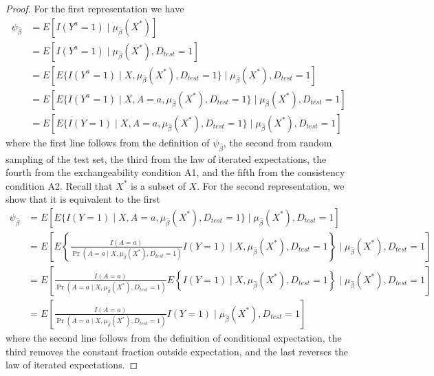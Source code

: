\begin{proof}
    For the first representation we have 
    \begin{align*}
        \psi_{\widehat{\beta}} &= E[I(Y^a = 1) \mid \mu_{\widehat{\beta}}(X^*)] \\
        & = E[I(Y^a = 1) \mid \mu_{\widehat{\beta}}(X^*), D_{test} = 1] \\
        & = E[E\{I(Y^a = 1) \mid X, \mu_{\widehat{\beta}}(X^*), D_{test} = 1\}\mid \mu_{\widehat{\beta}}(X^*), D_{test} = 1] \\
        & = E[E\{I(Y^a = 1) \mid X, A = a, \mu_{\widehat{\beta}}(X^*), D_{test} = 1\}\mid \mu_{\widehat{\beta}}(X^*), D_{test} = 1] \\
        & = E[E\{I(Y = 1) \mid X, A = a, \mu_{\widehat{\beta}}(X^*), D_{test} = 1\}\mid \mu_{\widehat{\beta}}(X^*), D_{test} = 1]
    \end{align*}
    where the first line follows from the definition of $\psi_{\widehat{\beta}}$, the second from random sampling of the test set, the third from the law of iterated expectations, the fourth from the exchangeability condition A1, and the fifth from the consistency condition A2. Recall that $X^*$ is a subset of $X$. For the second representation, we show that it is equivalent to the first 
    \begin{align*}
        \psi_{\widehat{\beta}} &= E[E\{I(Y = 1) \mid X, A = a, \mu_{\widehat{\beta}}(X^*), D_{test} = 1\}\mid \mu_{\widehat{\beta}}(X^*), D_{test} = 1] \\
        &= E\left[E\left\{\frac{I(A = a)}{\Pr(A = a \mid X, \mu_{\widehat{\beta}}(X^*), D_{test} = 1)} I(Y=1) \mid X, \mu_{\widehat{\beta}}(X^*), D_{test} = 1\right\}\mid \mu_{\widehat{\beta}}(X^*), D_{test} = 1\right] \\
        &= E\left[\frac{I(A = a)}{\Pr(A = a \mid X, \mu_{\widehat{\beta}}(X^*), D_{test} = 1)}E\left\{ I(Y=1) \mid X, \mu_{\widehat{\beta}}(X^*), D_{test} = 1\right\}\mid \mu_{\widehat{\beta}}(X^*), D_{test} = 1\right]\\
        &= E\left[\frac{I(A = a)}{\Pr(A = a \mid X, \mu_{\widehat{\beta}}(X^*), D_{test} = 1)} I(Y=1) \mid \mu_{\widehat{\beta}}(X^*), D_{test} = 1\right]
    \end{align*}
    where the second line follows from the definition of conditional expectation, the third removes the constant fraction outside expectation, and the last reverses the law of iterated expectations.
\end{proof}

